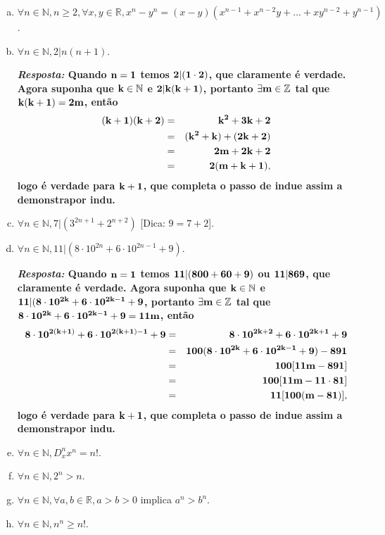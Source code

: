 \begin{enumerate}[{\bf 1.}]
\begin{enumerate}[a)]
\item $\forall n\in\mathbb{N}, n\geq 2, \forall x,y\in\mathbb{R}, x^n-y^n=(x-y)(x^{n-1}+x^{n-2}y+\ldots+xy^{n-2}+y^{n-1})$.
\item $\forall n\in\mathbb{N}, 2|n(n+1)$.

{\bf{\it Resposta:} Quando ${\bf n=1}$ temos ${\bf 2|(1\cdot 2)}$, que claramente é verdade. Agora suponha que ${\bf k\in\mathbb{N}}$ e ${\bf 2|k(k+1)}$, portanto ${\bf \exists m\in\mathbb{Z}}$ tal que ${\bf k(k+1)=2m}$, então
\begin{eqnarray*}
{\bf (k+1)(k+2)}&=&{\bf  k^2+3k+2}\\
                          &=&{\bf  (k^2+k)+(2k+2)}\\
                          &=&{\bf  2m+2k+2}\\
                          &=&{\bf  2(m+k+1)},
\end{eqnarray*}  
logo \'e verdade para ${\bf k+1}$, que completa o passo de indu\cao e assim a demonstra\cao por indu\caoi.}

\item $\forall n\in\mathbb{N}, 7|(3^{2n+1}+2^{n+2})$ [Dica: $9=7+2$].
\item $\forall n\in\mathbb{N}, 11|(8\cdot 10^{2n}+6\cdot 10^{2n-1}+9)$.

{\bf{\it Resposta:} Quando ${\bf n=1}$ temos ${\bf 11|(800+60+9)}$ ou ${\bf 11|869}$,  que claramente é verdade. Agora suponha que ${\bf k\in\mathbb{N}}$ e ${\bf 11|(8\cdot 10^{2k}+6\cdot 10^{2k-1}+9}$, portanto ${\bf \exists m\in\mathbb{Z}}$ tal que ${\bf 8\cdot 10^{2k}+6\cdot 10^{2k-1}+9=11m}$, então
\begin{eqnarray*}
{\bf 8\cdot 10^{2(k+1)}+6\cdot 10^{2(k+1)-1}+9}&=&{\bf  8\cdot 10^{2k+2}+6\cdot 10^{2k+1}+9}\\
                          &=&{\bf  100(8\cdot 10^{2k}+6\cdot 10^{2k-1}+9)-891}\\
                          &=&{\bf  100[11m-891]}\\
                          &=&{\bf  100[11m-11\cdot 81]}\\
                          &=&{\bf  11[100(m-81)]},
\end{eqnarray*}  
logo \'e verdade para ${\bf k+1}$, que completa o passo de indu\cao e assim a demonstra\cao por indu\caoi.}

\item $\forall n\in\mathbb{N}, D^n_x x^n=n!$.
\item $\forall n\in\mathbb{N}, 2^n>n$.
\item $\forall n\in\mathbb{N}, \forall a,b\in\mathbb{R}, a>b>0$ implica $a^n>b^n$.
\item $\forall n\in\mathbb{N}, n^n\geq n!$.


\end{enumerate}
\end{enumerate}
